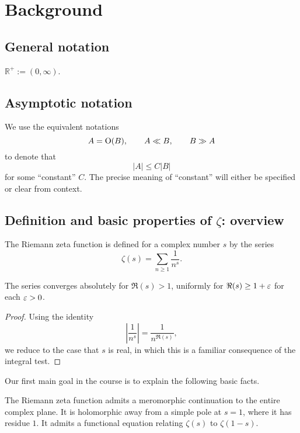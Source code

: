 \documentclass[reqno]{amsart}  \numberwithin{theorem}{section} \numberwithin{equation}{section}
\begin{document}
\newpage


\section{Background}\label{sec:cj4unj5r3k}

\subsection{General notation}
$\mathbb{R}^+ := (0,\infty)$.

\subsection{Asymptotic notation}
We use the equivalent notations
\begin{equation*}
  A = \operatorname{O}(B), \qquad A \ll B,
  \qquad B \gg A
\end{equation*}
to denote that
\begin{equation*}
  \lvert A \rvert \leq C \lvert B \rvert
\end{equation*}
for some ``constant'' $C$.  The precise meaning of ``constant'' will either be specified or clear from context.


\newpage
\subsection{Definition and basic properties of $\zeta$: overview}
The Riemann zeta function is defined for a complex number $s$ by the series
\begin{equation*}
  \zeta (s) = \sum_{n \geq 1} \frac{1}{n^s }.
\end{equation*}
\begin{lemma}
  The series converges absolutely for $\Re(s) > 1$, uniformly for $\Re(s) \geq 1 + \varepsilon$ for each $\varepsilon > 0$.
\end{lemma}
\begin{proof}
  Using the identity
  \begin{equation*}
    \left\lvert \frac{1}{n^s} \right\rvert = \frac{1}{n^{\Re(s)}},
  \end{equation*}
  we reduce to the case that $s$ is real, in which this is a familiar consequence of the integral test.
\end{proof}

Our first main goal in the course is to explain the following basic facts.
\begin{theorem}
  The Riemann zeta function admits a meromorphic continuation to the entire complex plane.  It is holomorphic away from a simple pole at $s = 1$, where it has residue $1$.  It admits a functional equation relating $\zeta (s)$ to $\zeta (1-s)$.
\end{theorem}
\end{document}
